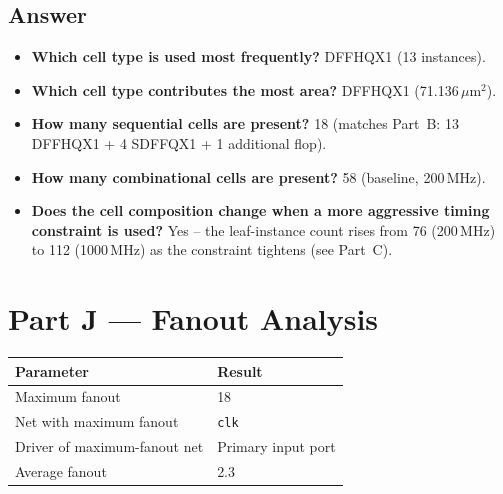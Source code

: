 \documentclass[11pt]{article}
\begin{document}
\subsection*{Answer}
\begin{itemize}
    \item \textbf{Which cell type is used most frequently?} DFFHQX1 (13 instances).
    \item \textbf{Which cell type contributes the most area?} DFFHQX1 (71.136\,$\mu$m$^2$).
    \item \textbf{How many sequential cells are present?} 18 (matches Part~B: 13 DFFHQX1 + 4
    SDFFQX1 + 1 additional flop).
    \item \textbf{How many combinational cells are present?} 58 (baseline, 200\,MHz).
    \item \textbf{Does the cell composition change when a more aggressive timing constraint is
    used?} Yes -- the leaf-instance count rises from 76 (200\,MHz) to 112 (1000\,MHz) as the
    constraint tightens (see Part~C).
\end{itemize}

\section{Part J --- Fanout Analysis}
\begin{center}
\begin{tabular}{|l|l|}
\hline
\textbf{Parameter} & \textbf{Result} \\ \hline
Maximum fanout & 18 \\ \hline
Net with maximum fanout & \texttt{clk} \\ \hline
Driver of maximum-fanout net & Primary input port \\ \hline
Average fanout & 2.3 \\ \hline
\end{tabular}
\end{center}
\end{document}
